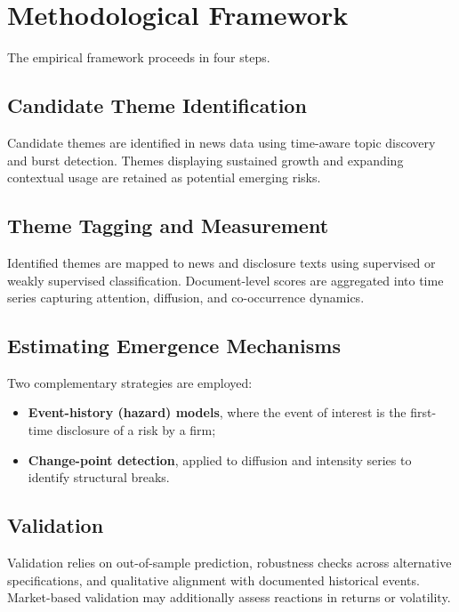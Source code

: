 \documentclass[11pt,a4paper]{article}
\begin{document}
\section{Methodological Framework}

The empirical framework proceeds in four steps.

\subsection{Candidate Theme Identification}

Candidate themes are identified in news data using time-aware topic discovery and burst detection. Themes displaying sustained growth and expanding contextual usage are retained as potential emerging risks.

\subsection{Theme Tagging and Measurement}

Identified themes are mapped to news and disclosure texts using supervised or weakly supervised classification. Document-level scores are aggregated into time series capturing attention, diffusion, and co-occurrence dynamics.

\subsection{Estimating Emergence Mechanisms}

Two complementary strategies are employed:
\begin{itemize}
    \item \textbf{Event-history (hazard) models}, where the event of interest is the first-time disclosure of a risk by a firm;
    \item \textbf{Change-point detection}, applied to diffusion and intensity series to identify structural breaks.
\end{itemize}

\subsection{Validation}

Validation relies on out-of-sample prediction, robustness checks across alternative specifications, and qualitative alignment with documented historical events. Market-based validation may additionally assess reactions in returns or volatility.
\end{document}
